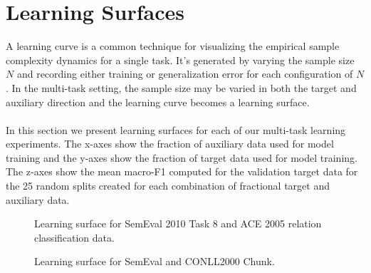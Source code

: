 \section{Learning Surfaces}
A learning curve is a common technique for visualizing the empirical sample complexity dynamics for a single task. It's generated by varying the sample size $N$ and recording either training or generalization error for each configuration of $N$. In the multi-task setting, the sample size may be varied in both the target and auxiliary direction and the learning curve becomes a learning surface.
\\\\
In this section we present learning surfaces for each of our multi-task learning experiments. The x-axes show the fraction of auxiliary data used for model training and the y-axes show the fraction of target data used for model training. The z-axes show the mean macro-F1 computed for the validation target data for the 25 random splits created for each combination of fractional target and auxiliary data.

\newpage
\pagestyle{empty}
\vspace*{2cm}
\begin{figure}[h!]
	\hspace*{-2cm}
	\caption{Learning surface for SemEval 2010 Task 8 and ACE 2005 relation classification data.}
\end{figure}
\begin{figure}[h!]
	\hspace*{-2cm}
	\caption{Learning surface for SemEval and CONLL2000 Chunk.}
\end{figure}
\newpage
\pagestyle{plain}
